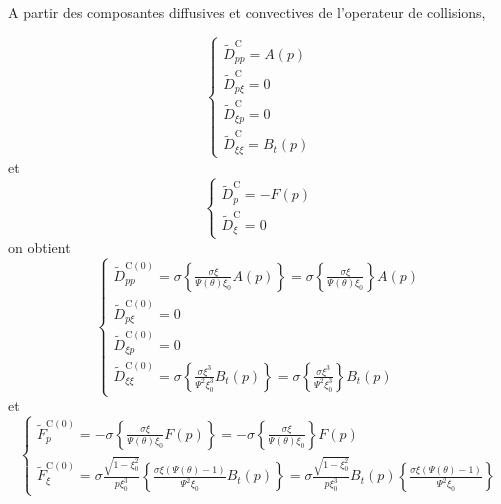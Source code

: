A partir des composantes diffusives et convectives de l'operateur
de collisions,

\[
\left\{ \begin{array}{l}
\widetilde{D}_{pp}^{\text{C}}=A(p)\\
\widetilde{D}_{p\xi}^{\text{C}}=0\\
\widetilde{D}_{\xi p}^{\text{C}}=0\\
\widetilde{D}_{\xi\xi}^{\text{C}}=B_{t}(p)\end{array}\right.\]
 et \[
\left\{ \begin{array}{l}
\widetilde{D}_{p}^{\text{C}}=-F(p)\\
\widetilde{D}_{\xi}^{\text{C}}=0\end{array}\right.\]
 on obtient \[
\left\{ \begin{array}{l}
\widetilde{D}_{pp}^{\text{C}(0)}=\sigma\left\{ \frac{\sigma\xi}{\Psi(\theta)\xi_{0}}A(p)\right\} =\sigma\left\{ \frac{\sigma\xi}{\Psi(\theta)\xi_{0}}\right\} A(p)\\
\widetilde{D}_{p\xi}^{\text{C}(0)}=0\\
\widetilde{D}_{\xi p}^{\text{C}(0)}=0\\
\widetilde{D}_{\xi\xi}^{\text{C}(0)}=\sigma\left\{ \frac{\sigma\xi^{3}}{\Psi^{2}\xi_{0}^{3}}B_{t}(p)\right\} =\sigma\left\{ \frac{\sigma\xi^{3}}{\Psi^{2}\xi_{0}^{3}}\right\} B_{t}(p)\end{array}\right.\]
 et \[
\left\{ \begin{array}{l}
\widetilde{F}_{p}^{\text{C}(0)}=-\sigma\left\{ \frac{\sigma\xi}{\Psi(\theta)\xi_{0}}F(p)\right\} =-\sigma\left\{ \frac{\sigma\xi}{\Psi(\theta)\xi_{0}}\right\} F(p)\\
\widetilde{F}_{\xi}^{\text{C}(0)}=\sigma\frac{\sqrt{1-\xi_{0}^{2}}}{p\xi_{0}^{3}}\left\{ \frac{\sigma\xi\left(\Psi(\theta)-1\right)}{\Psi^{2}\xi_{0}}B_{t}(p)\right\} =\sigma\frac{\sqrt{1-\xi_{0}^{2}}}{p\xi_{0}^{3}}B_{t}(p)\left\{ \frac{\sigma\xi\left(\Psi(\theta)-1\right)}{\Psi^{2}\xi_{0}}\right\} \end{array}\right.\]


